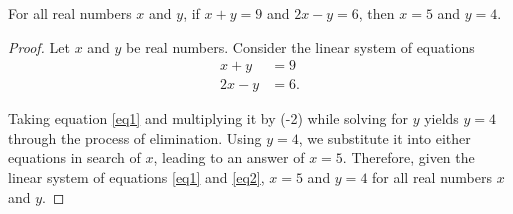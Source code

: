 \documentclass{article}
\begin{document}

\begin{prop*} 
    For all real numbers $x$ and $y$, if $x+y = 9$ and $2x-y = 6$, then $x = 5$ and $y = 4$. 
\end{prop*}

\begin{proof}
    Let $x$ and $y$ be real numbers. Consider the linear system of equations
    \begin{align}
        x+y &= 9 \label{eq1} \\
        2x-y &= 6 \label{eq2}.
    \end{align}
    
    Taking equation \eqref{eq1} and multiplying it by (-2) while solving for $y$ yields $ y=4$ through the process of elimination. Using $y=4$, we substitute it into either equations in search of $x$, leading to an answer of $x=5$. Therefore, given the linear system of equations \eqref{eq1} and \eqref{eq2}, $x=5$ and $y=4$ for all real numbers $x$ and $y$.
    
    
    
    
    
    
    
    
\end{proof}
\end{document}
